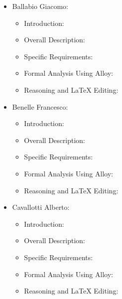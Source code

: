 
\begin{itemize}
    \item Ballabio Giacomo:
        \begin{itemize}
            \item Introduction: 
            \item Overall Description:
            \item Specific Requirements:
            \item Formal Analysis Using Alloy:
            \item Reasoning and LaTeX Editing:
        \end{itemize}
    \item Benelle Francesco:
    \begin{itemize}
        \item Introduction: 
        \item Overall Description:
        \item Specific Requirements:
        \item Formal Analysis Using Alloy:
        \item Reasoning and LaTeX Editing:
    \end{itemize}
    \item Cavallotti Alberto:
    \begin{itemize}
        \item Introduction: 
        \item Overall Description:
        \item Specific Requirements:
        \item Formal Analysis Using Alloy:
        \item Reasoning and LaTeX Editing:
    \end{itemize}
\end{itemize}